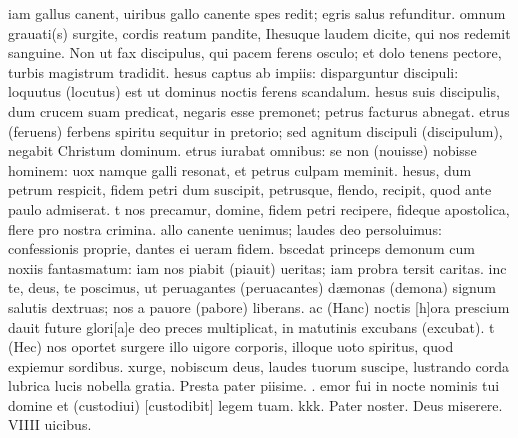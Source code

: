 \documentclass[letter,12pt]{book}
\makeatletter
\DeclareRobustCommand{\Vbar}{\vers@resp{-0.1em}{V}}
\newcommand{\vers@resp@sym}{\raisebox{0.2ex}{\rotatebox[origin=c]{-20}{$\m@th\rceil$}}}
\newcommand{\vers@resp}[2]{%
  {\ooalign{\hidewidth\kern#1\vers@resp@sym\hidewidth\cr#2\cr}}%
}%
\def\V{\color{Red} \Vbar . \color{black}}
\makeatother
\begin{document}
iam gallus canent, uiribus
gallo canente spes redit;
egris salus refunditur.
omnum grauati(s) surgite,
cordis reatum pandite,
Ihesuque laudem dicite,
qui nos redemit sanguine.
{\color{Red} N}on ut fax discipulus,
qui pacem ferens osculo;
et dolo tenens pectore,
turbis magistrum tradidit.
hesus captus ab impiis:
disparguntur discipuli:
loquutus (locutus) est ut dominus
noctis ferens scandalum.
hesus suis discipulis,
dum crucem suam predicat,
negaris esse premonet;
petrus facturus abnegat.
etrus (feruens) ferbens spiritu
sequitur in pretorio;
sed agnitum discipuli (discipulum),
negabit Christum dominum.
etrus iurabat omnibus:
se non (nouisse) nobisse hominem:
uox namque galli resonat,
et petrus culpam meminit.
hesus, dum petrum respicit,
fidem petri dum suscipit,
petrusque, flendo, recipit,
quod ante paulo admiserat.
t nos precamur, domine,
fidem petri recipere,
fideque apostolica,
flere pro nostra crimina.
allo canente uenimus;
laudes deo persoluimus:
confessionis proprie,
dantes ei ueram fidem.
bscedat princeps demonum
cum noxiis
fantasmatum:
iam nos piabit (piauit) ueritas;
iam probra tersit caritas.
inc te, deus, te poscimus,
ut peruagantes (peruacantes) d\ae monas (demona)
signum salutis dextruas; %
nos a pauore (pabore) liberans.
ac (Hanc) noctis [h]ora prescium
dauit future glori[a]e
deo preces multiplicat,
in matutinis excubans (excubat).
t (Hec) nos oportet surgere
illo uigore corporis,
illoque uoto spiritus,
quod expiemur sordibus.
xurge, nobiscum deus,
laudes tuorum suscipe,
lustrando corda lubrica
lucis nobella gratia. {\color{Red} P}resta pater piisime.
\newline \V {\color{Red} M}emor fui in nocte nominis tui domine et (custodiui) [custodibit] legem tuam. {\color{Red} kkk. P}ater noster. {\color{Red} D}eus miserere. VIIII uicibus.
\end{document}
